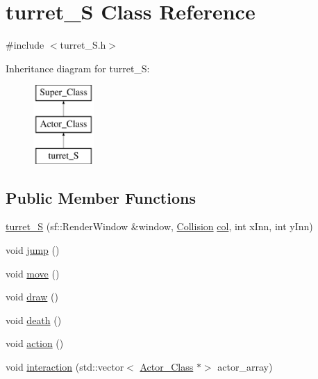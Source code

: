 \hypertarget{classturret___s}{}\section{turret\+\_\+S Class Reference}
\label{classturret___s}


{\ttfamily \#include $<$turret\+\_\+\+S.\+h$>$}

Inheritance diagram for turret\+\_\+S\+:\begin{figure}[H]
\begin{center}
\leavevmode
\includegraphics[height=3.000000cm]{classturret___s}
\end{center}
\end{figure}
\subsection*{Public Member Functions}
\begin{DoxyCompactItemize}
\item 
\hyperlink{classturret___s_a757d1306bfb2c669e7a9d1f5f66188e3}{turret\+\_\+S} (sf\+::\+Render\+Window \&window, \hyperlink{class_collision}{Collision} \hyperlink{classturret___s_a2a4209e21831ca2879cdb6bf783db73c}{col}, int x\+Inn, int y\+Inn)
\item 
void \hyperlink{classturret___s_ab4ac035f439af50905a72227b19072a9}{jump} ()
\item 
void \hyperlink{classturret___s_a9ecfd60470958a3bcfbda2f4b751f8ab}{move} ()
\item 
void \hyperlink{classturret___s_ad5699c9932a20914961dde81c5a96d86}{draw} ()
\item 
void \hyperlink{classturret___s_a14320bc891a632978c4808bcb385e4b1}{death} ()
\item 
void \hyperlink{classturret___s_a34ce31ab5648dab8b5cfb7c94d96cf3a}{action} ()
\item 
void \hyperlink{classturret___s_ae7e579ddf3982d6914491784595f1c16}{interaction} (std\+::vector$<$ \hyperlink{class_actor___class}{Actor\+\_\+\+Class} $\ast$$>$ actor\+\_\+array)
\end{DoxyCompactItemize}
